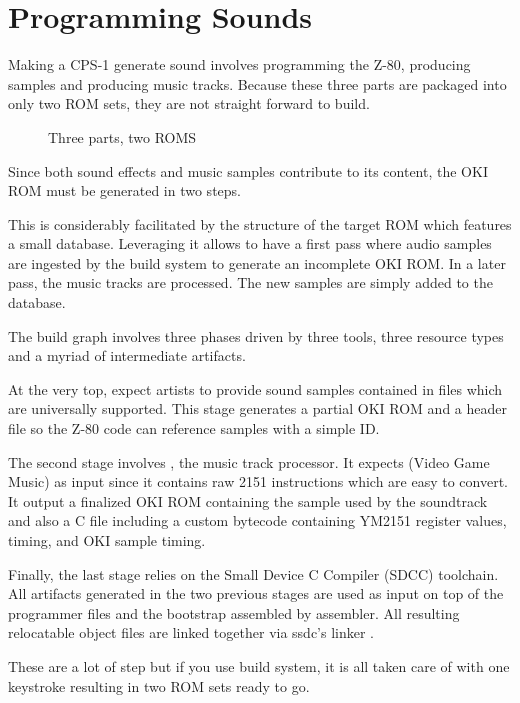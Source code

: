 \chapter{Programming Sounds}

Making a CPS-1 generate sound involves programming the Z-80, producing samples and producing music tracks. Because these three parts are packaged into only two ROM sets, they are not straight forward to build. 


 \begin{figure}[H]
\caption*{Three parts, two ROMS}
\end{figure}

Since both sound effects and music samples contribute to its content, the OKI ROM must be generated in two steps.

This is considerably facilitated by the structure of the target ROM which features a small database. Leveraging it allows to have a first pass where audio samples are ingested by the build system to generate an incomplete OKI ROM. In a later pass, the music tracks are processed. The new samples are simply added to the database.


The build graph involves three phases driven by three tools, three resource types and a myriad of intermediate artifacts. 

At the very top,  expect artists to provide sound samples contained in  files which are universally supported. This stage generates a partial OKI ROM and a  header file so the Z-80 code can reference samples with a simple ID.

The second stage involves , the music track processor. It expects  (Video Game Music) as input since it contains raw 2151 instructions which are easy to convert. It output a finalized OKI ROM containing the sample used by the soundtrack and also a  C file including a custom bytecode containing YM2151 register values, timing, and OKI sample timing.

Finally, the last stage relies on the Small Device C Compiler (SDCC) toolchain. All artifacts generated in the two previous stages are used as input on top of the programmer  files and the bootstrap  assembled by  assembler. All resulting relocatable object files  are linked together via ssdc's linker . 


\begin{trivia}
These are a lot of step but if you use  build system, it is all taken care of with one keystroke resulting in two ROM sets ready to go.
\end{trivia}

